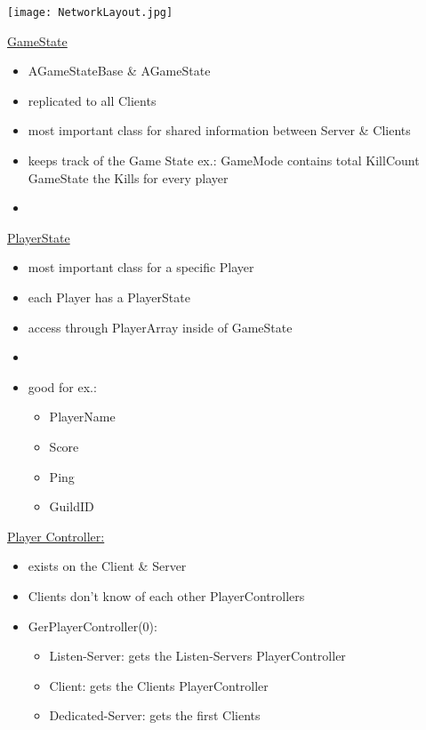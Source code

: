 \texttt{[image: NetworkLayout.jpg]}

        \uline{GameState}
        \begin{itemize}
            \item AGameStateBase \& AGameState
            \item replicated to all Clients
            \item most important class for shared information between Server \& Clients
            \item keeps track of the Game State ex.: GameMode contains total KillCount GameState the Kills for every player
            \item 
        \end{itemize}

        \uline{PlayerState}
        \begin{itemize}
            \item most important class for a specific Player
            \item each Player has a PlayerState
            \item access through PlayerArray inside of GameState
            \item 
            \item good for ex.:
            \begin{itemize}
                \item PlayerName
                \item Score
                \item Ping
                \item GuildID
            \end{itemize}
        \end{itemize}

        \uline{Player Controller:}
        \begin{itemize}
            \item exists on the Client \& Server
            \item Clients don't know of each other PlayerControllers
            \item GerPlayerController(0):
            \begin{itemize}
                \item Listen-Server: gets the Listen-Servers PlayerController
                \item Client: gets the Clients PlayerController
                \item Dedicated-Server: gets the first Clients \
            \end{itemize}
        \end{itemize}

